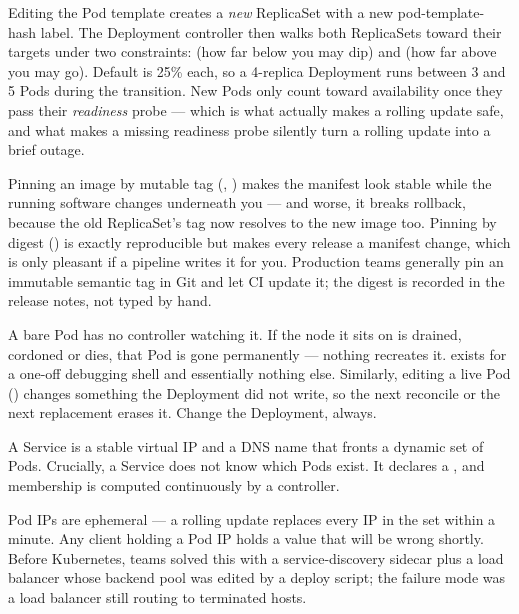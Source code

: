  Editing the Pod template creates a \emph{new} ReplicaSet with a new pod-template-hash label. The Deployment controller then walks both ReplicaSets toward their targets under two constraints:  (how far below  you may dip) and  (how far above you may go). Default is 25\% each, so a 4-replica Deployment runs between 3 and 5 Pods during the transition. New Pods only count toward availability once they pass their \emph{readiness} probe --- which is what actually makes a rolling update safe, and what makes a missing readiness probe silently turn a rolling update into a brief outage.

\begin{tradeoff}
Pinning an image by mutable tag (, ) makes the manifest look stable while the running software changes underneath you --- and worse, it breaks rollback, because the old ReplicaSet's tag now resolves to the new image too. Pinning by digest () is exactly reproducible but makes every release a manifest change, which is only pleasant if a pipeline writes it for you. Production teams generally pin an immutable semantic tag in Git and let CI update it; the digest is recorded in the release notes, not typed by hand.
\end{tradeoff}

\begin{misconception}
A bare Pod has no controller watching it. If the node it sits on is drained, cordoned or dies, that Pod is gone permanently --- nothing recreates it.  exists for a one-off debugging shell and essentially nothing else. Similarly, editing a live Pod () changes something the Deployment did not write, so the next reconcile or the next replacement erases it. Change the Deployment, always.
\end{misconception}


 A Service is a stable virtual IP and a DNS name that fronts a dynamic set of Pods. Crucially, a Service does not know which Pods exist. It declares a , and membership is computed continuously by a controller.

 Pod IPs are ephemeral --- a rolling update replaces every IP in the set within a minute. Any client holding a Pod IP holds a value that will be wrong shortly. Before Kubernetes, teams solved this with a service-discovery sidecar plus a load balancer whose backend pool was edited by a deploy script; the failure mode was a load balancer still routing to terminated hosts.

